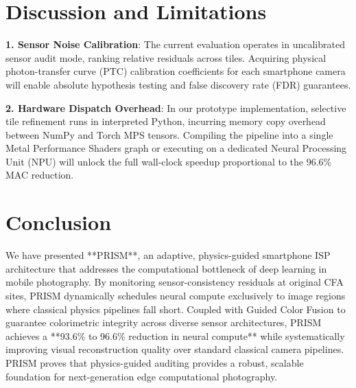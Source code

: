 \documentclass[10pt,twocolumn]{article}
\begin{document}
\section{Discussion and Limitations}

\textbf{1. Sensor Noise Calibration}: The current evaluation operates in uncalibrated sensor audit mode, ranking relative residuals across tiles. Acquiring physical photon-transfer curve (PTC) calibration coefficients for each smartphone camera will enable absolute hypothesis testing and false discovery rate (FDR) guarantees.

\textbf{2. Hardware Dispatch Overhead}: In our prototype implementation, selective tile refinement runs in interpreted Python, incurring memory copy overhead between NumPy and Torch MPS tensors. Compiling the pipeline into a single Metal Performance Shaders graph or executing on a dedicated Neural Processing Unit (NPU) will unlock the full wall-clock speedup proportional to the 96.6\% MAC reduction.

\section{Conclusion}

We have presented **PRISM**, an adaptive, physics-guided smartphone ISP architecture that addresses the computational bottleneck of deep learning in mobile photography. By monitoring sensor-consistency residuals at original CFA sites, PRISM dynamically schedules neural compute exclusively to image regions where classical physics pipelines fall short. Coupled with Guided Color Fusion to guarantee colorimetric integrity across diverse sensor architectures, PRISM achieves a **93.6\% to 96.6\% reduction in neural compute** while systematically improving visual reconstruction quality over standard classical camera pipelines. PRISM proves that physics-guided auditing provides a robust, scalable foundation for next-generation edge computational photography.
\end{document}
